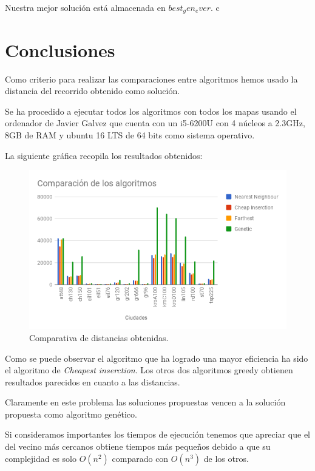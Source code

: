 \documentclass{article}
\begin{document}
Nuestra mejor solución está almacenada en $best_gen_ever$.
c\section{Conclusiones}

Como criterio para realizar las comparaciones entre algoritmos hemos usado la
distancia del recorrido obtenido como solución.

Se ha procedido a ejecutar todos los algoritmos con todos los mapas
usando el ordenador de Javier Galvez que cuenta con un i5-6200U con 4
núcleos a 2.3GHz, 8GB de RAM y ubuntu 16 LTS de 64 bits como sistema
operativo.

La siguiente gráfica recopila los resultados obtenidos:

\begin{figure}[H]
  \centering
  \includegraphics[width=1\textwidth]{distancias.png}
  \caption{Comparativa de distancias obtenidas.}
\end{figure}

Como se puede observar el algoritmo que ha logrado una mayor
eficiencia ha sido el algoritmo de \textit{Cheapest inserction}. Los
otros dos algoritmos greedy obtienen resultados parecidos en cuanto a
las distancias.

Claramente en este problema las soluciones propuestas vencen a la
solución propuesta como algoritmo genético.

Si consideramos importantes los tiempos de ejecución tenemos que
apreciar que el del vecino más cercanos obtiene tiempos más pequeños
debido a que su complejidad es solo $O(n^2)$ comparado con $O(n^3)$ de
los otros.
\end{document}
